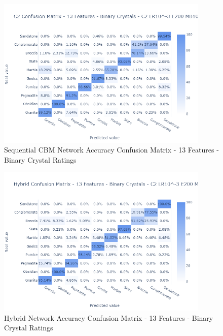 \begin{figure}[H]
  \centering
    \includegraphics[width=0.9\textwidth, trim = 0cm 0cm 0.5cm 3.5cm, clip]{images/C2 Confusion Matrix - 13 Features - Binary Crystals.png}
    \caption{Sequential CBM Network Accuracy Confusion Matrix - 13 Features - Binary Crystal Ratings} \label{fig:Sequential CBM Network Accuracy Confusion Matrix - 13 Features - Binary Crystal Ratings}
\end{figure}

\begin{figure}[H]
  \centering
    \includegraphics[width=0.9\textwidth, trim = 0cm 0cm 0.5cm 3.5cm, clip]{images/Hybrid Confusion Matrix- 13 Features - Binary Crystals.png}
    \caption{Hybrid Network Accuracy Confusion Matrix - 13 Features - Binary Crystal Ratings} \label{fig:Hybrid Network Accuracy -  13 Features - Binary Crystal Ratings - Confusion Matrix}
\end{figure}

